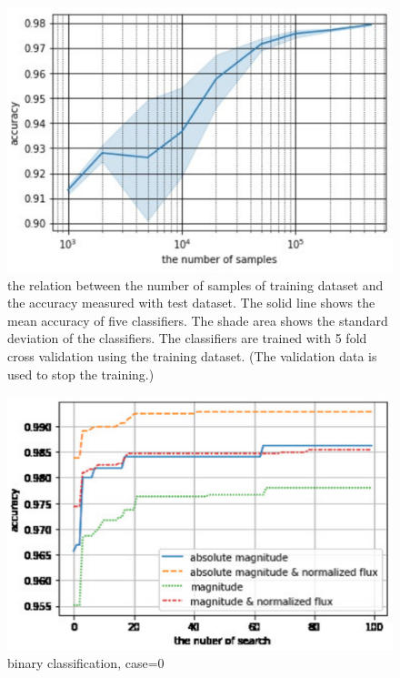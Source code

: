 \documentclass[useamsfonts]{pasj01}
\begin{document}
\begin{figure}[ht]
  \begin{center}
     \includegraphics[width=\columnwidth]{figures/size_accuracy.eps}
  \end{center}
  \caption{%
  the relation between the number of samples of training dataset and the accuracy measured with test dataset. The solid line shows the mean accuracy of five classifiers. The shade area shows the standard deviation of the classifiers. The classifiers are trained with 5 fold cross validation using the training dataset. (The validation data is used to stop the training.)
  }%
  \label{fig:size_convergence_test}
\end{figure}
\begin{figure}[ht]
  \begin{center}
     \includegraphics[width=\columnwidth]{figures/hp_iterations_accuracy.eps}
  \end{center}
  \caption{%
  binary classification, case=0
  }%
  \label{fig:size_convergence_test}
\end{figure}
%
\end{document}
